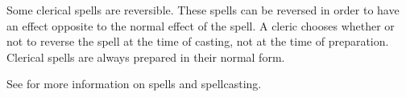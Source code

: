 \begin{multicols*}{2}
Some clerical spells are reversible. These spells can be reversed in order to have an effect opposite to the normal effect of the spell. A cleric chooses whether or not to reverse the spell at the time of casting, not at the time of preparation. Clerical spells are always prepared in their normal form.

See  for more information on spells and spellcasting.


\end{multicols*}
